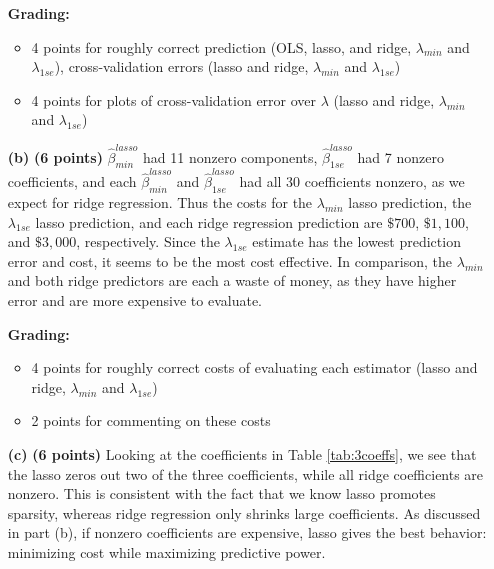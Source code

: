 \documentclass[12pt]{article}
\renewcommand{\hat}{\widehat}
\newcommand{\1}{\mathbbm{1}}
\begin{document}
\begin{enumerate}
\newpage
{\bf Grading:}
\begin{itemize}
\item 4 points for roughly correct prediction (OLS, lasso, and ridge,
$\lambda_{min}$ and $\lambda_{1se}$), cross-validation errors (lasso and ridge,
$\lambda_{min}$ and $\lambda_{1se}$)
\item 4 points for plots of cross-validation error over $\lambda$ (lasso and 
ridge, $\lambda_{min}$ and $\lambda_{1se}$)
\end{itemize}

\item[{\bf (b)}] {\bf (6 points)}
$\hat \beta^{lasso}_{min}$ had 11 nonzero components,
$\hat \beta^{lasso}_{1se}$ had 7 nonzero coefficients, and each
$\hat \beta^{lasso}_{min}$ and $\hat \beta^{lasso}_{1se}$ had all 30
coefficients nonzero, as we expect for ridge regression. Thus the costs for the
$\lambda_{min}$ lasso prediction, the $\lambda_{1se}$ lasso prediction, and
each ridge regression prediction are $\$700$, $\$1,100$, and $\$3,000$,
respectively. Since the $\lambda_{1se}$ estimate has the lowest prediction
error and cost, it seems to be the most cost effective. In comparison, the
$\lambda_{min}$ and both ridge predictors are each a waste of money, as they
have higher error and are more expensive to evaluate.

{\bf Grading:}
\begin{itemize}
\item 4 points for roughly correct costs of evaluating each estimator (lasso
and ridge, $\lambda_{min}$ and $\lambda_{1se}$)
\item 2 points for commenting on these costs
\end{itemize}

\item[{\bf (c)}] {\bf (6 points)}
Looking at the coefficients in Table \ref{tab:3coeffs}, we see that the lasso
zeros out two of the three coefficients, while all ridge coefficients are
nonzero. This is consistent with the fact that we know lasso promotes sparsity,
whereas ridge regression only shrinks large coefficients. As discussed in part
(b), if nonzero coefficients are expensive, lasso gives the best behavior:
minimizing cost while maximizing predictive power.


\end{enumerate}
\end{document}
